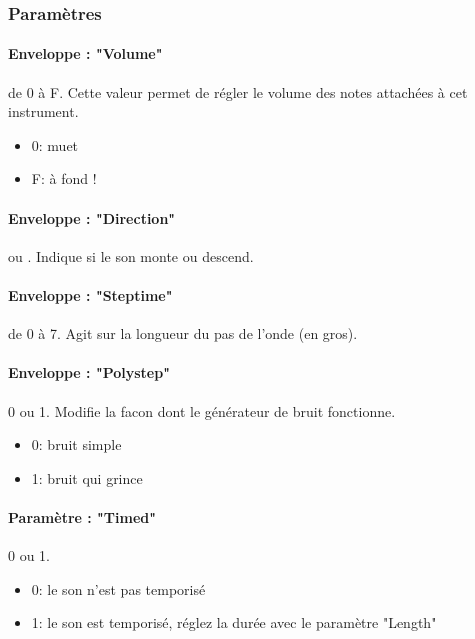 
\subsubsection{Paramètres}

\paragraph{Enveloppe : "Volume"} de 0 à F.
Cette valeur permet de régler le volume des notes attachées à cet instrument.
\medskip

\begin{itemize}
    \item{0: muet}
    \item{F: à fond !}
\end{itemize}

\paragraph{Enveloppe : "Direction"}  ou .
    Indique si le son monte ou descend.

\paragraph{Enveloppe : "Steptime"} de 0 à 7.
Agit sur la longueur du pas de l'onde (en gros).

\paragraph{Enveloppe : "Polystep"} 0 ou 1.
Modifie la facon dont le générateur de bruit fonctionne.
\medskip

\begin{itemize}
    \item{0: bruit simple}
    \item{1: bruit qui grince}
\end{itemize}

\paragraph{Paramètre : "Timed"} 0 ou 1.
\medskip

\begin{itemize}
        \item{0: le son n'est pas temporisé}
        \item{1: le son est temporisé, réglez la durée avec le paramètre "Length"}
    \end{itemize}

